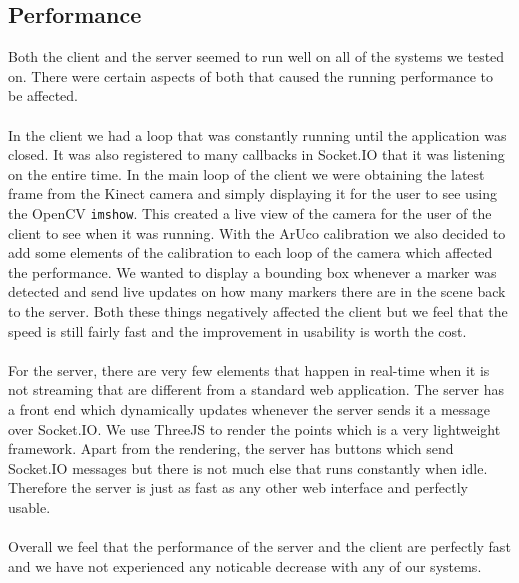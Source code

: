 \documentclass{article}
\begin{document}
\subsection{Performance}
Both the client and the server seemed to run well on all of the systems we tested on. There were certain aspects of both that caused the running performance to be affected.
\\\\
In the client we had a loop that was constantly running until the application was closed. It was also registered to many callbacks in Socket.IO that it was listening on the entire time. In the main loop of the client we were obtaining the latest frame from the Kinect camera and simply displaying it for the user to see using the OpenCV \texttt{imshow}. This created a live view of the camera for the user of the client to see when it was running. With the ArUco calibration we also decided to add some elements of the calibration to each loop of the camera which affected the performance. We wanted to display a bounding box whenever a marker was detected and send live updates on how many markers there are in the scene back to the server. Both these things negatively affected the client but we feel that the speed is still fairly fast and the improvement in usability is worth the cost.
\\\\
For the server, there are very few elements that happen in real-time when it is not streaming that are different from a standard web application. The server has a front end which dynamically updates whenever the server sends it a message over Socket.IO. We use ThreeJS to render the points which is a very lightweight framework. Apart from the rendering, the server has buttons which send Socket.IO messages but there is not much else that runs constantly when idle. Therefore the server is just as fast as any other web interface and perfectly usable.
\\\\
Overall we feel that the performance of the server and the client are perfectly fast and we have not experienced any noticable decrease with any of our systems.
\end{document}
